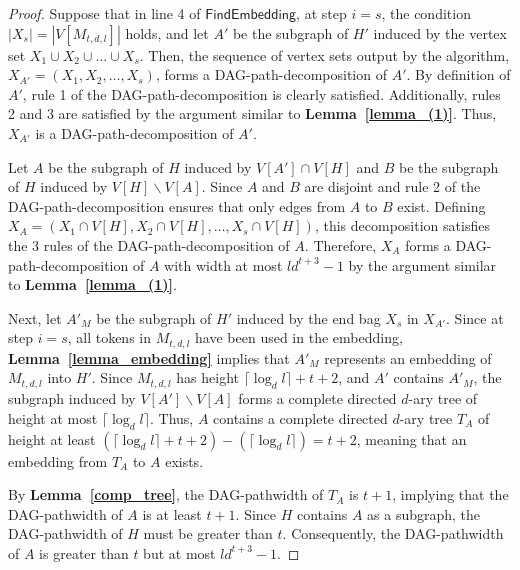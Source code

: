 \documentclass[runningheads]{llncs}
\theoremstyle{plain}
\theoremstyle{definition}
\begin{document}
\begin{proof}
    Suppose that in line 4 of $\mathsf{FindEmbedding}$, at step $i=s$, the condition $|X_s| = |V[M_{t, d, l}]|$ holds, and let $A'$ be the subgraph of $H'$ induced by the vertex set $X_1 \cup X_2 \cup \dots \cup X_s$. Then, the sequence of vertex sets output by the algorithm, $X_{A'} = (X_1, X_2, \dots , X_s)$, forms a DAG-path-decomposition of $A'$. By definition of $A'$, rule 1 of the DAG-path-decomposition is clearly satisfied. Additionally, rules 2 and 3 are satisfied by the argument similar to \textbf{Lemma~\ref{lemma_(1)}}. Thus, $X_{A'}$ is a DAG-path-decomposition of $A'$.

    Let $A$ be the subgraph of $H$ induced by $V[A'] \cap V[H]$ and $B$ be the subgraph of $H$ induced by $V[H] \backslash V[A]$. Since $A$ and $B$ are disjoint and rule 2 of the DAG-path-decomposition ensures that only edges from $A$ to $B$ exist. Defining $X_A = (X_1 \cap V[H], X_2 \cap V[H], \dots , X_s \cap V[H])$, this decomposition satisfies the 3 rules of the DAG-path-decomposition of $A$. Therefore, $X_A$ forms a DAG-path-decomposition of $A$ with width at most $ld^{t+3}-1$ by the argument similar to \textbf{Lemma~\ref{lemma_(1)}}.

    Next, let $A'_M$ be the subgraph of $H'$ induced by the end bag $X_s$ in $X_{A'}$. Since at step $i=s$, all tokens in $M_{t, d, l}$ have been used in the embedding, \textbf{Lemma~\ref{lemma_embedding}} implies that $A'_M$ represents an embedding of $M_{t, d, l}$ into $H'$. Since $M_{t, d, l}$ has height $\lceil \log_d l \rceil +t+2$, and $A'$ contains $A'_M$, the subgraph induced by $V[A'] \backslash V[A]$ forms a complete directed $d$-ary tree of height at most $\lceil \log_d l \rceil$. Thus, $A$ contains a complete directed $d$-ary tree $T_A$ of height at least $(\lceil \log_d l \rceil +t+2) - (\lceil \log_d l \rceil) = t+2$, meaning that an embedding from $T_A$ to $A$ exists. 

    By \textbf{Lemma~\ref{comp_tree}}, the DAG-pathwidth of $T_A$ is $t+1$, implying that the DAG-pathwidth of $A$ is at least $t+1$. Since $H$ contains $A$ as a subgraph, the DAG-pathwidth of $H$ must be greater than $t$. Consequently, the DAG-pathwidth of $A$ is greater than $t$ but at most $ld^{t+3}-1$.
\end{proof}
\end{document}
